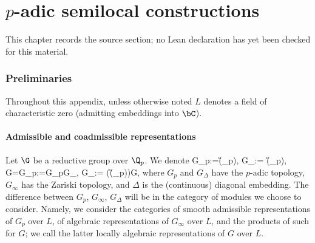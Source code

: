 \chapter{$p$-adic semilocal  constructions}
\label{universal-p-adic-gross-zagier-formula-chapter-08}

\begin{remark}
\label{universal-p-adic-gross-zagier-formula-chapter-08-source}
This chapter records the source section; no Lean declaration has yet been checked for this material.
\notready
\end{remark}







\subsection{Preliminaries}
Throughout this appendix, unless otherwise noted  $L$ denotes a field of characteristic zero (admitting embeddings into $\bC$).


\subsubsection{Admissible and coadmissible representations} Let $\G$ be a reductive group over $\Q_{p}$. We denote
\beq {}
G_{p}:=\G(\Q_{p}), \qquad G_{\infty}:= \G(\Q_{p}), \qquad G=G_{p\infty}:=G_{p}\ts G_{\infty}, \qquad G_{\Delta}:= \Delta(\G(\Q_{p}))\subset G, \eeq
where $G_{p}$ and $G_{\Delta}$ have the $p$-adic topology, $G_{\infty}$ has the Zariski topology, and  $\Delta $ is the (continuous) diagonal embedding. The difference between $G_{p}$, $G_{\infty}$, $G_{\Delta}$ will be in the category of modules we choose to consider.  Namely, we consider the categories of smooth admissible representations of $G_{p}$ over $L$, of algebraic representations of $G_{\infty}$ over $L$, and the products of such for $G$; we call the  latter locally algebraic representations of $G$ over $L$.


